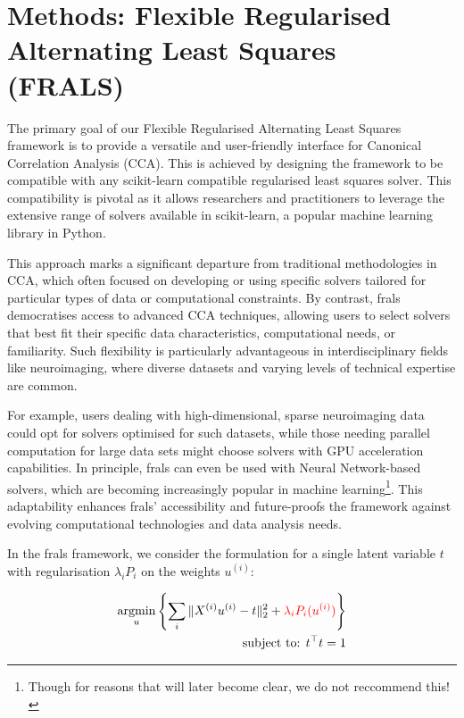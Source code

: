 \section{Methods: Flexible Regularised Alternating Least Squares (FRALS)}\label{subsec:flexible-regularised-alternating-least-squares-(frals)}

The primary goal of our Flexible Regularised Alternating Least Squares framework is to provide a versatile and user-friendly interface for Canonical Correlation Analysis (CCA). This is achieved by designing the framework to be compatible with any scikit-learn compatible regularised least squares solver.
This compatibility is pivotal as it allows researchers and practitioners to leverage the extensive range of solvers available in scikit-learn, a popular machine learning library in Python.

This approach marks a significant departure from traditional methodologies in CCA, which often focused on developing or using specific solvers tailored for particular types of data or computational constraints.
By contrast, \acrshort{frals} democratises access to advanced CCA techniques, allowing users to select solvers that best fit their specific data characteristics, computational needs, or familiarity.
Such flexibility is particularly advantageous in interdisciplinary fields like neuroimaging, where diverse datasets and varying levels of technical expertise are common.

For example, users dealing with high-dimensional, sparse neuroimaging data could opt for solvers optimised for such datasets, while those needing parallel computation for large data sets might choose solvers with GPU acceleration capabilities.
In principle, \acrshort{frals} can even be used with Neural Network-based solvers, which are becoming increasingly popular in machine learning\footnote{Though for reasons that will later become clear, we do not reccommend this!}.
This adaptability enhances \acrshort{frals}' accessibility and future-proofs the framework against evolving computational technologies and data analysis needs.

In the \acrshort{frals} framework, we consider the formulation for a single latent variable \(t\) with regularisation \(\lambda_i P_i\) on the weights \(u^{(i)}\):

\begin{align}
    \underset{u}{\mathrm{argmin}}\left\{\sum_i \|X^{(i)} u^{(i)} - t\|_2^2 + \textcolor{red}{\lambda_i P_i(u^{(i)})} \right\}\\
    \text{subject to: }t^\top t = 1 \notag
\end{align}

